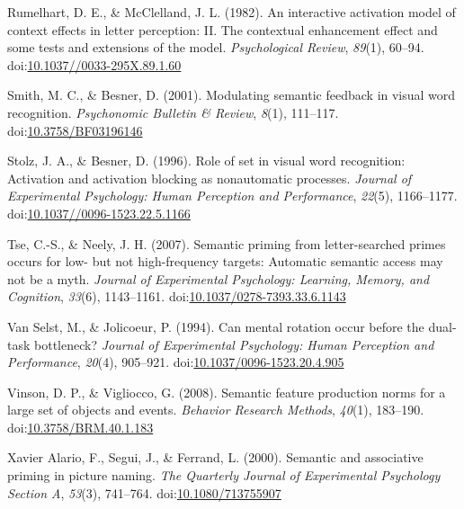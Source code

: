 \documentclass[english,man]{apa6}
\theoremstyle{definition}
\theoremstyle{definition}
\theoremstyle{definition}
\theoremstyle{remark}
\begin{document}
\hypertarget{ref-Rumelhart1982}{}
Rumelhart, D. E., \& McClelland, J. L. (1982). An interactive activation
model of context effects in letter perception: II. The contextual
enhancement effect and some tests and extensions of the model.
\emph{Psychological Review}, \emph{89}(1), 60--94.
doi:\href{https://doi.org/10.1037//0033-295X.89.1.60}{10.1037//0033-295X.89.1.60}

\hypertarget{ref-Smith2001}{}
Smith, M. C., \& Besner, D. (2001). Modulating semantic feedback in
visual word recognition. \emph{Psychonomic Bulletin \& Review},
\emph{8}(1), 111--117.
doi:\href{https://doi.org/10.3758/BF03196146}{10.3758/BF03196146}

\hypertarget{ref-Stolz1996a}{}
Stolz, J. A., \& Besner, D. (1996). Role of set in visual word
recognition: Activation and activation blocking as nonautomatic
processes. \emph{Journal of Experimental Psychology: Human Perception
and Performance}, \emph{22}(5), 1166--1177.
doi:\href{https://doi.org/10.1037//0096-1523.22.5.1166}{10.1037//0096-1523.22.5.1166}

\hypertarget{ref-Tse2007}{}
Tse, C.-S., \& Neely, J. H. (2007). Semantic priming from
letter-searched primes occurs for low- but not high-frequency targets:
Automatic semantic access may not be a myth. \emph{Journal of
Experimental Psychology: Learning, Memory, and Cognition}, \emph{33}(6),
1143--1161.
doi:\href{https://doi.org/10.1037/0278-7393.33.6.1143}{10.1037/0278-7393.33.6.1143}

\hypertarget{ref-VanSelst1994}{}
Van Selst, M., \& Jolicoeur, P. (1994). Can mental rotation occur before
the dual-task bottleneck? \emph{Journal of Experimental Psychology:
Human Perception and Performance}, \emph{20}(4), 905--921.
doi:\href{https://doi.org/10.1037/0096-1523.20.4.905}{10.1037/0096-1523.20.4.905}

\hypertarget{ref-Vinson2008}{}
Vinson, D. P., \& Vigliocco, G. (2008). Semantic feature production
norms for a large set of objects and events. \emph{Behavior Research
Methods}, \emph{40}(1), 183--190.
doi:\href{https://doi.org/10.3758/BRM.40.1.183}{10.3758/BRM.40.1.183}

\hypertarget{ref-XavierAlario2000}{}
Xavier Alario, F., Segui, J., \& Ferrand, L. (2000). Semantic and
associative priming in picture naming. \emph{The Quarterly Journal of
Experimental Psychology Section A}, \emph{53}(3), 741--764.
doi:\href{https://doi.org/10.1080/713755907}{10.1080/713755907}
\end{document}
